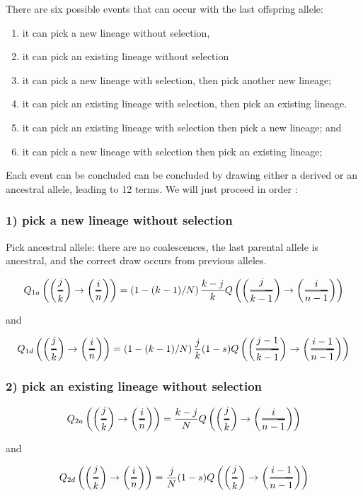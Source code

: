 \documentclass[]{article}
\newcommand{\Dfrac}[2]{%
  \ooalign{%
    $\left(\genfrac{}{}{1.2pt}0{#1}{#2}\right)$\cr%
    $\color{white}\genfrac{}{}{.4pt}0{\phantom{#1}}{\phantom{#2}}$}%
}
\begin{document}
There are six possible events that can occur with the last offspring allele: 

\begin{enumerate}
\item it can pick a new lineage without selection, 
\item it can pick an existing lineage without selection
\item it can pick a new lineage with selection, then pick another new lineage;
\item it can pick an existing lineage with selection, then pick an existing lineage. 
\item it can pick an existing lineage with selection then pick a new lineage; and 
\item it can pick a new lineage with selection then pick an existing lineage; 

\end{enumerate}
Each event can be concluded can be concluded by drawing either a derived or an ancestral allele, leading to 12 terms. We will just proceed in order :

\subsubsection{1) pick a new lineage without selection}
Pick ancestral allele: there are no coalescences, the last parental allele is ancestral, and the correct draw occurs from previous alleles. 

$$Q_{1a}\left(\Dfrac{j}{k} \rightarrow \Dfrac{i}{n} \right) = \left(1-(k-1)/N\right)\frac{k-j}{k} Q\left(\Dfrac{j}{k-1} \rightarrow \Dfrac{i}{n-1} \right) $$
 
 and 
 
$$Q_{1d}\left(\Dfrac{j}{k} \rightarrow \Dfrac{i}{n} \right) = \left(1-(k-1)/N\right)\frac{j}{k} (1-s) Q\left(\Dfrac{j-1}{k-1} \rightarrow \Dfrac{i-1}{n-1} \right) $$

\subsubsection{2) pick an existing lineage without selection}


$$Q_{2a}\left(\Dfrac{j}{k} \rightarrow \Dfrac{i}{n} \right) = \frac{k-j}{N} Q\left(\Dfrac{j}{k} \rightarrow \Dfrac{i}{n-1} \right) $$
 
 and 
 
$$Q_{2d}\left(\Dfrac{j}{k} \rightarrow \Dfrac{i}{n} \right) =  \frac{j}{N} (1-s) Q\left(\Dfrac{j}{k} \rightarrow \Dfrac{i-1}{n-1} \right) $$
\end{document}
